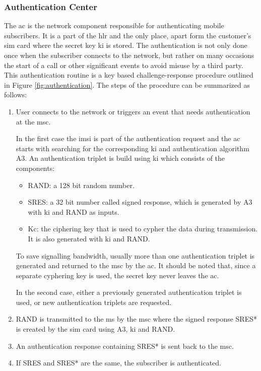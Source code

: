 \subsubsection{Authentication Center}
The \gls{ac} is the network component responsible for authenticating mobile subscribers.
It is a part of the \gls{hlr} and the only place, apart form the customer's \gls{sim} card where the secret key \gls{ki} is stored.
The authentication is not only done once when the subscriber connects to the network, but rather on many occasions \eg the start of a call or other significant events to avoid misuse by a third party.
This authentication routine is a key based challenge-response procedure outlined in Figure \ref{fig:authentication}.
The steps of the procedure can be summarized as follows:
\begin{enumerate}
	\item User connects to the network or triggers an event that needs authentication at the \gls{msc}.
 	
 	In the first case the \gls{imsi} is part of the authentication request and the \gls{ac} starts with searching for the corresponding \gls{ki} and authentication algorithm A3.
	An authentication triplet is build using \gls{ki} which consists of the components:
	\begin{itemize}
		\item RAND: a 128 bit random number.
		\item SRES: a 32 bit number called signed response, which is generated by A3 with \gls{ki} and RAND as inputs.
		\item Kc: the ciphering key that is used to cypher the data during transmission.
		It is also generated with \gls{ki} and RAND.
	\end{itemize}
	To save signalling bandwidth, usually more than one authentication triplet is generated and returned to the \gls{msc} by the \gls{ac}.
	It should be noted that, since a separate cyphering key is used, the secret key never leaves the \gls{ac}.
	
	In the second case, either a previously generated authentication triplet is used, or new authentication triplets are requested.
	\item RAND is transmitted to the \gls{ms} by the \gls{msc} where the signed response SRES* is created by the \gls{sim} card using A3, \gls{ki} and RAND.
	
	\item An authentication response containing SRES* is sent back to the \gls{msc}.
	
	\item If SRES and SRES* are the same, the subscriber is authenticated.
\end{enumerate}

